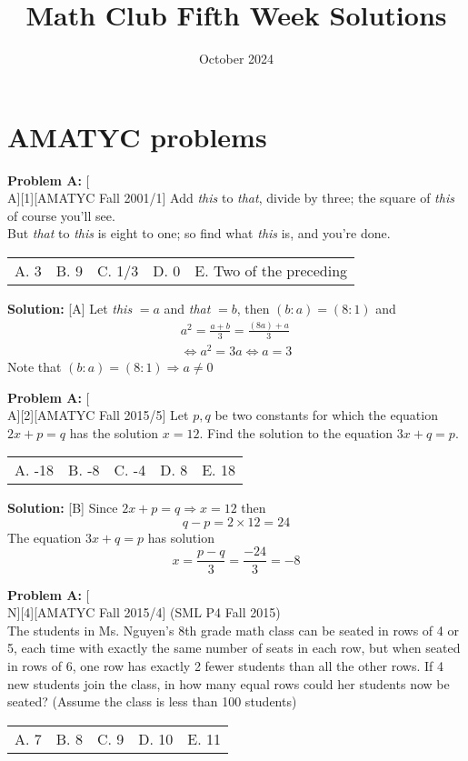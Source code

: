\documentclass[12pt]{article}
\title{Math Club Fifth Week Solutions}
\date{October 2024}
\makeatletter
\newcounter{problem}
\newenvironment{problem}[1]{%
    \stepcounter{problem}
    \noindent\textbf{Problem A\theproblem:} #1
    \\[1em]
}{}
\newcommand{\multChoice}[5]{%
    \begin{tabular}{l @{\hskip 1.5cm} l @{\hskip 1.5cm} l @{\hskip 1.5cm} l @{\hskip 1.5cm} l}
    A. #1 & B. #2 & C. #3 & D. #4 & E. #5
    \end{tabular}
}
\newenvironment{solution}{%
    \vspace{1em}
    \noindent\textbf{Solution:} 
}{}
\makeatother
\begin{document}
\sloppy
\maketitle

\section*{AMATYC problems}

\begin{problem}[A][1][AMATYC Fall 2001/1]
    Add \textit{this} to \textit{that}, divide by three; the square of \textit{this} of course you'll see. \\
    But \textit{that} to \textit{this} is eight to one; so find what \textit{this} is, and you're done.
    \multChoice{3}{9}{1/3}{0}{Two of the preceding}
\end{problem}


\begin{solution}[A]
    Let \textit{this} $=a$ and \textit{that} $=b$, then $(b:a)=(8:1)$ and
    \begin{align*}
        a^2=\frac{a+b}{3}=\frac{(8a)+a}{3} \\
        \iff a^2 = 3a \iff a=3
    \end{align*}
    Note that $(b:a)=(8:1) \Rightarrow a \neq 0$
\end{solution}

\begin{problem}[A][2][AMATYC Fall 2015/5]
    Let $p,q$ be two constants for which the equation $2x + p = q$ has the solution $x = 12$. Find the solution to the equation $3x + q = p$.
    \multChoice{-18}{-8}{-4}{8}{18}
\end{problem}


\begin{solution}[B]
    Since $2x+p=q \Rightarrow x=12$ then
    $$q-p = 2 \times 12 = 24$$
    The equation $3x+q=p$ has solution
    $$x = \frac{p-q}{3} = \frac{-24}{3}=-8$$
\end{solution}

\begin{problem}[N][4][AMATYC Fall 2015/4]
    (SML P4 Fall 2015) \\
    The students in Ms. Nguyen's 8th grade math class can be seated in rows of 4 or 5, each time with exactly the same number of seats in each row, but when seated in rows of 6, one row has exactly 2 fewer students than all the other rows. If 4 new students join the class, in how many equal rows could her students now be seated? (Assume the class is less than 100 students)
    \multChoice{7}{8}{9}{10}{11}
\end{problem}
\end{document}
